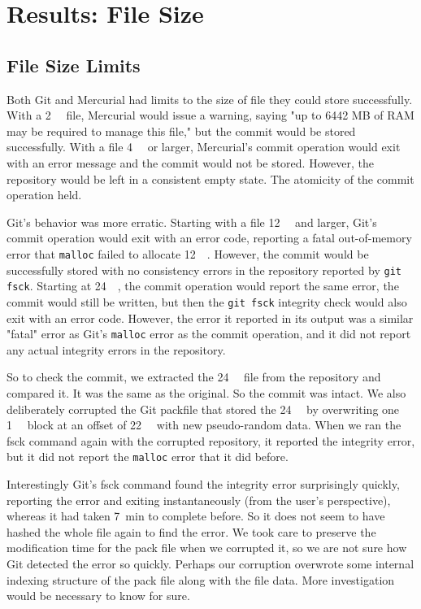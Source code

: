 \section{Results: File Size}

\subsection{File Size Limits}
\label{file-size-limits-results}

Both Git and Mercurial had limits to the size of file they could store
successfully. With a \SI{2}{\gibi\byte} file, Mercurial would issue a warning,
saying "up to 6442 MB of RAM may be required to manage this file," but the
\gls{commit} would be stored successfully. With a file \SI{4}{\gibi\byte} or
larger, Mercurial's \gls{commit} operation would exit with an error message and
the \gls{commit} would not be stored. However, the repository would be left in a
consistent empty state. The atomicity of the \gls{commit} operation held.

Git's behavior was more erratic. Starting with a file \SI{12}{\gibi\byte} and
larger, Git's \gls{commit} operation would exit with an error code, reporting a
fatal out-of-memory error that \lstinline{malloc} failed to allocate
\SI{12}{\gibi\byte}. However, the \gls{commit} would be successfully stored with
no consistency errors in the repository reported by \lstinline{git fsck}.
Starting at \SI{24}{\gibi\byte}, the \gls{commit} operation would report the
same error, the \gls{commit} would still be written, but then the 
\lstinline{git fsck} integrity check would also exit with an error code.
However, the error it reported in its output was a similar "fatal" error as
Git's \lstinline{malloc} error as the \gls{commit} operation, and it did not
report any actual integrity errors in the repository.

So to check the \gls{commit}, we extracted the \SI{24}{\gibi\byte} file from the
repository and compared it. It was the same as the original. So the \gls{commit}
was intact. We also deliberately corrupted the Git \gls{packfile} that stored
the \SI{24}{\gibi\byte} by overwriting one \SI{1}{\mebi\byte} block at an offset
of \SI{22}{\gibi\byte} with new pseudo-random data. When we ran the fsck command
again with the corrupted repository, it reported the integrity error, but it did
not report the \lstinline{malloc} error that it did before.

Interestingly Git's fsck command found the integrity error surprisingly quickly,
reporting the error and exiting instantaneously (from the user's perspective),
whereas it had taken \SI{7}{\minute} to complete before. So it does not seem to
have hashed the whole file again to find the error. We took care to preserve the
modification time for the pack file when we corrupted it, so we are not sure how
Git detected the error so quickly. Perhaps our corruption overwrote some
internal indexing structure of the pack file along with the file data. More
investigation would be necessary to know for sure.

